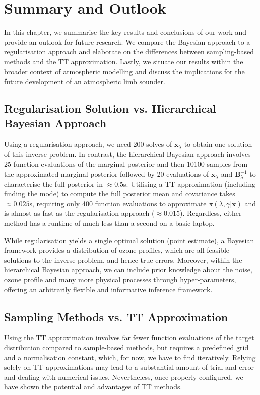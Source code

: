\chapter{Summary and Outlook}
\label{ch:Concl}
In this chapter, we summarise the key results and conclusions of our work and provide an outlook for future research.
We compare the Bayesian approach to a regularisation approach and elaborate on the differences between sampling-based methods and the TT approximation.
Lastly, we situate our results within the broader context of atmospheric modelling and discuss the implications for the future development of an atmospheric limb sounder.



\section{Regularisation Solution vs. Hierarchical Bayesian Approach}
Using a regularisation approach, we need 200 solves of $\bm{x}_{\lambda}$ to obtain one solution of this inverse problem.
In contrast, the hierarchical Bayesian approach involves 25 function evaluations of the marginal posterior and then 10100 samples from the approximated marginal posterior followed by 20 evaluations of $\bm{x}_{\lambda}$ and $\bm{B}^{-1}_{\lambda}$ to characterise the full posterior in $\approx 0.5$s.
Utilising a TT approximation (including finding the mode) to compute the full posterior mean and covariance takes $\approx 0.025$s, requiring only 400 function evaluations to approximate $\pi(\lambda, \gamma | \bm{x})$ and is almost as fast as the regularisation approach ($\approx 0.015$).
Regardless, either method has a runtime of much less than a second on a basic laptop.

While regularisation yields a single optimal solution (point estimate), a Bayesian framework provides a distribution of ozone profiles, which are all feasible solutions to the inverse problem, and hence true errors.
Moreover, within the hierarchical Bayesian approach, we can include prior knowledge about the noise, ozone profile and many more physical processes through hyper-parameters, offering an arbitrarily flexible and informative inference framework.


\section{Sampling Methods vs. TT Approximation}
Using the TT approximation involves far fewer function evaluations of the target distribution compared to sample-based methods, but requires a predefined grid and a normalisation constant, which, for now, we have to find iteratively.
Relying solely on TT approximations may lead to a substantial amount of trial and error and dealing with numerical issues.
Nevertheless, once properly configured, we have shown the potential and advantages of TT methods.

